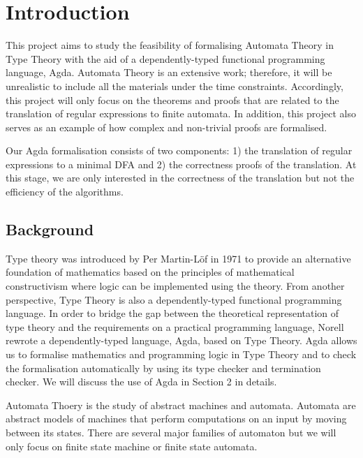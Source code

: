 \section{Introduction}
\par This project aims to study the feasibility of formalising
Automata Theory \cite{aho1972} in Type Theory
\cite{martin1984} with the aid of a dependently-typed functional
programming language, Agda. Automata Theory is an extensive work;
therefore, it will be unrealistic to
include all the materials under the time constraints. Accordingly,
this project will only focus on the theorems and
proofs that are related to the translation of regular expressions
to finite automata. In addition, this project also serves as an
example of how complex and non-trivial proofs are formalised. 

\par Our Agda formalisation consists of two components: 1) the
translation of regular expressions to a minimal DFA and 2)
the correctness proofs of the translation. At this stage, we are only
interested in the correctness of the translation but not the
efficiency of the algorithms. 


\subsection{Background}
\par Type theory was introduced by Per Martin-L{\"o}f in
1971 to provide an alternative foundation of mathematics based on the
principles of mathematical constructivism where logic can be
implemented using the theory. From another perspective, Type Theory is also a
dependently-typed functional programming language. In order to bridge the gap between
the theoretical representation of type theory and the requirements on
a practical programming language, Norell \cite{norell2007} rewrote a
dependently-typed language, Agda, based on Type Theory. Agda allows us
to formalise mathematics and programming logic in Type Theory and to 
check the formalisation automatically by using its type checker and termination
checker. We will discuss the use of Agda in Section
2 in details. 
\par Automata Thoery is the study of abstract machines and
automata. Automata are abstract models of machines that perform
computations on an input by moving between its states. There
are several major families of automaton but we will
only focus on finite state machine or finite state automata. 


